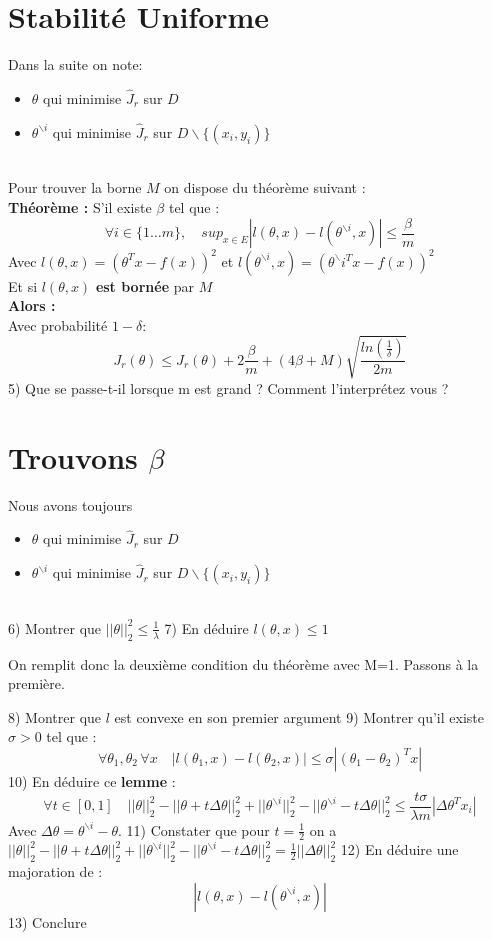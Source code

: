 \documentclass[12pt]{article}
\begin{document}
\section{ Stabilité Uniforme }   
Dans la suite on note:   
\begin{itemize}
\item $\theta$ qui minimise $\hat{J}_r$ sur $D$ 
\item $\theta^{ \backslash i}$  qui minimise $\hat{J}_r$ sur $D \backslash \{(x_i,y_i)\}$       
   
\end{itemize} \ \\

Pour trouver la borne $M$ on dispose du théorème suivant :  \\ 
\textbf{Théorème :} S'il existe $\beta$ tel que :  
$$ \forall i \in \{1 \dots m \},  \quad sup_{x \in E} |l(\theta,x)-l(\theta^{ \backslash i},x)| \leq \frac{\beta}{m}$$   
Avec $l(\theta,x) = (\theta^{T} x - f(x))^2$ et    $l(\theta^{\backslash i},x) = (\theta^\backslash{i}^{T} x - f(x))^2$    \\
Et si $l(\theta,x)$ \textbf{est bornée} par $M$  \\
\textbf{Alors :}    \\
Avec probabilité $1-\delta$:     
$$ J_r(\theta) \leq \hat{J}_r(\theta) + 2 \frac{\beta}{m} + (4\beta + M)\sqrt{\frac{ln(\frac{1}{\delta})}{2m}} $$   
5) Que se passe-t-il lorsque m est grand ? Comment l'interprétez vous ?

\section{Trouvons $\beta$}
Nous avons toujours    
\begin{itemize}
\item $\theta$ qui minimise $\hat{J}_r$ sur $D$ 
\item $\theta^{ \backslash i}$  qui minimise $\hat{J}_r$ sur $D \backslash \{(x_i,y_i)\}$       
   
\end{itemize} \ \\
6) Montrer que $||\theta||^2_2 \leq \frac{1}{\lambda}$    
7) En déduire $l(\theta,x) \leq 1$      
    
On remplit donc la deuxième condition du théorème avec M=1.    
Passons à la première.   
    
8) Montrer que $l$ est convexe en son premier argument   
9) Montrer qu'il existe $\sigma > 0$ tel que :
$$ \forall \theta_1,\theta_2 \, \forall x \quad |l(\theta_1,x)-l(\theta_2,x)| \leq \sigma |(\theta_1 - \theta_2)^T x|$$      
10) En déduire ce \textbf{lemme} :      
$$ \forall t \in [0,1] \quad ||\theta||^2_2 - ||\theta + t \Delta \theta||_2^2 + ||\theta^{ \backslash i}||_2^2 - ||\theta^{ \backslash i} - t \Delta \theta||_2^2 \leq \frac{t \sigma}{\lambda m}|\Delta \theta^T x_i| $$   
Avec $\Delta \theta = \theta^{ \backslash i} - \theta$.    
11) Constater que pour $t=\frac{1}{2}$ on a $||\theta||^2_2 - ||\theta + t \Delta \theta||_2^2 + ||\theta^{ \backslash i}||_2^2 - ||\theta^{ \backslash i} - t \Delta \theta||_2^2 = \frac{1}{2}||\Delta \theta||^2_2$   
12) En déduire une majoration de : 
$$ |l(\theta,x)-l(\theta^{ \backslash i},x)| $$    
13) Conclure
\end{document}
